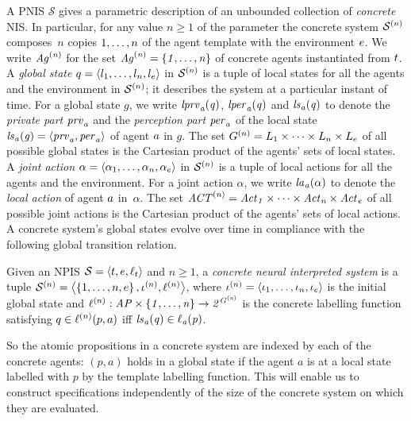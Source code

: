 A PNIS $\mathcal S$ gives a parametric description of an unbounded collection
of {\em concrete} NIS. In particular, for any value $n \geq 1$ of the parameter
the concrete system $\mathcal{S}^{(n)}$ composes~$n$ copies ${1}, \ldots, {n}$ of the
agent template with the environment ${e}$. We write $\it{Ag}^{(n)}$ for the set
$\it{Ag}^{(n)} = \left \{ {1}, \ldots, {n} \right \}$ of concrete agents instantiated from
${t}$.
%
A \emph{global state} $q = \left \langle l_{1}, \ldots, l_{n}, l_{e} \right \rangle$ in
$\mathcal{S}^{(n)}$ is a tuple of local states for all the agents and the environment in
$\mathcal{S}^{(n)}$; it describes the system at a particular instant of time.  For a
global state $g$, we write $\it{lprv}_{a}(q)$, $\it{lper}_{a}(q)$ and $\it{ls}_{a}(q)$ to
denote the \emph{private part} $\it{prv}_{a}$ and the \emph{perception part} $\it{per}_{a}$
of the local state $\it{ls}_{a}(g) = \left \langle \it{prv}_{a}, \it{per}_{a} \right \rangle$ of agent ${a}$ in
$g$.  The set $G^{(n)}=L_{1}\times\dots\times L_{n}\times L_e$
of all possible global states is the Cartesian product of the agents' sets of
local states.
% 
A \emph{joint action} $\alpha = \left \langle \alpha_1, \ldots, \alpha_n, \alpha_e \right \rangle$
in $\mathcal{S}^{(n)}$ is a tuple of local actions for all the agents and the environment.
For a joint action $\alpha$, we write $\it{la}_{a}({\alpha})$ to denote the
\emph{local action} of agent ${a}$ in~$\alpha$.  The set
$\it{ACT}^{(n)} = \it{Act}_{1}\times\dots\times\it{Act}_{n}\times\it{Act}_{e}$ of all
possible joint actions is the Cartesian product of the agents' sets of local
actions.  A concrete system's global states evolve over time in compliance with
the following global transition relation.


\begin{definition}
  \label{def:concreteystem}
Given an NPIS $\mathcal S = \left \langle {t}, {e}, \ell_t \right \rangle$ and $n \geq 1$, a
\emph{concrete neural interpreted system} is a tuple $\mathcal{S}^{(n)} = \left \langle  \left \{ {1},
\ldots, {n}, {e} \right \}, \iota^{({n})}, \ell^{(n)} \right \rangle$, where $\iota^{({n})} =
\left \langle \iota_{1}, \ldots, \iota_{n}, \iota_{e} \right \rangle$ is the initial global state and
$\ell^{(n)} :  \it{AP} \times \left \{ 1, \ldots, n  \right \} \rightarrow 2^{G^{(n)}}$ is the concrete labelling function satisfying $q \in \ell^{(n)}(p,a)$ iff
$\it{ls}_{a}(q) \in \ell_{a}(p)$.
\end{definition}

So the atomic propositions in a concrete system are indexed by each of the
concrete agents: $(p, a)$ holds in a global state if the agent $a$ is at a local
state labelled with $p$ by the template labelling function. This will enable us
to construct specifications independently of the size of the concrete system on
which they are evaluated.


